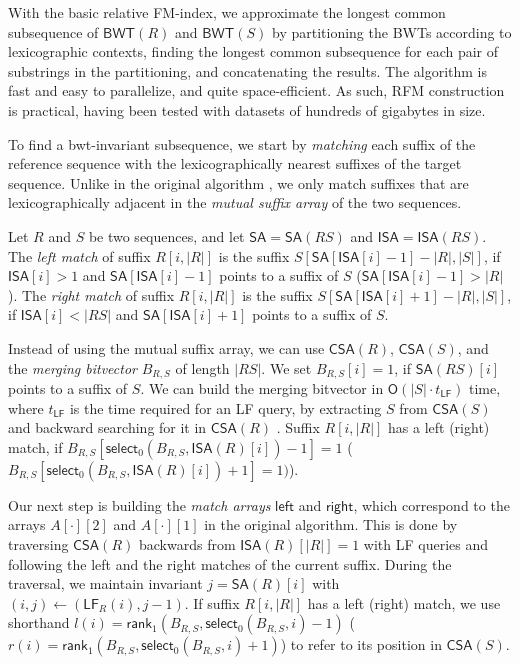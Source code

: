 \documentclass[a4paper,11pt]{llncs}
\newcommand{\abs}[1]{\ensuremath{\lvert #1 \rvert}}
\newcommand{\BWT}{\textsf{BWT}}
\newcommand{\RFM}{\textsf{RFM}}
\newcommand{\mSA}{\ensuremath{\mathsf{SA}}}
\newcommand{\mISA}{\ensuremath{\mathsf{ISA}}}
\newcommand{\mBWT}{\ensuremath{\mathsf{BWT}}}
\newcommand{\mCSA}{\ensuremath{\mathsf{CSA}}}
\newcommand{\mleft}{\ensuremath{\mathsf{left}}}
\newcommand{\mright}{\ensuremath{\mathsf{right}}}
\newcommand{\LF}{\textsf{LF}}
\newcommand{\mLF}{\ensuremath{\mathsf{LF}}}
\newcommand{\mrank}{\ensuremath{\mathsf{rank}}}
\newcommand{\mselect}{\ensuremath{\mathsf{select}}}
\newcommand{\Oh}{\ensuremath{\mathsf{O}}}
\begin{document}
With the basic relative FM-index, we approximate the longest common
subsequence of $\mBWT(R)$ and $\mBWT(S)$ by partitioning the \BWT{}s according
to lexicographic contexts, finding the longest common subsequence for each
pair of substrings in the partitioning, and concatenating the results. The
algorithm is fast and easy to parallelize, and quite space-efficient. As such,
\RFM{} construction is practical, having been tested with datasets of hundreds
of gigabytes in size.

To find a bwt-invariant subsequence, we start by \emph{matching} each suffix
of the reference sequence with the lexicographically nearest suffixes of the
target sequence. Unlike in the original algorithm \cite{Belazzougui2014}, we
only match suffixes that are lexicographically adjacent in the \emph{mutual
suffix array} of the two sequences.

\begin{definition}
Let $R$ and $S$ be two sequences, and let $\mSA = \mSA(RS)$ and $\mISA =
\mISA(RS)$. The \emph{left match} of suffix $R[i,\abs{R}]$ is the suffix
$S[\mSA[\mISA[i]-1] - \abs{R}, \abs{S}]$, if $\mISA[i] > 1$ and
$\mSA[\mISA[i]-1]$ points to a suffix of $S$ ($\mSA[\mISA[i]-1] > \abs{R}$).
The \emph{right match} of suffix $R[i,\abs{R}]$ is the suffix
$S[\mSA[\mISA[i]+1] - \abs{R}, \abs{S}]$, if $\mISA[i] < \abs{RS}$ and
$\mSA[\mISA[i]+1]$ points to a suffix of $S$.
\end{definition}

Instead of using the mutual suffix array, we can use $\mCSA(R)$, $\mCSA(S)$,
and the \emph{merging bitvector} $B_{R,S}$ of length $\abs{RS}$. We set
$B_{R,S}[i] = 1$, if $\mSA(RS)[i]$ points to a suffix of $S$. We can build the
merging bitvector in $\Oh(\abs{S} \cdot t_{\mLF})$ time, where $t_{\mLF}$ is
the time required for an \LF{} query, by extracting $S$ from $\mCSA(S)$ and
backward searching for it in $\mCSA(R)$ \cite{Siren2009}. Suffix
$R[i,\abs{R}]$ has a left (right) match, if $B_{R,S}[\mselect_{0}(B_{R,S},
\mISA(R)[i])-1] = 1$ ($B_{R,S}[\mselect_{0}(B_{R,S}, \mISA(R)[i])+1] = 1)$).

Our next step is building the \emph{match arrays} $\mleft$ and $\mright$,
which correspond to the arrays $A[\cdot][2]$ and $A[\cdot][1]$ in the original
algorithm. This is done by traversing $\mCSA(R)$ backwards from
$\mISA(R)[\abs{R}] = 1$ with \LF{} queries and following the left and the
right matches of the current suffix. During the traversal, we maintain
invariant $j = \mSA(R)[i]$ with $(i,j) \leftarrow (\mLF_{R}(i), j-1)$. If
suffix $R[i,\abs{R}]$ has a left (right) match, we use shorthand $l(i) =
\mrank_{1}(B_{R,S}, \mselect_{0}(B_{R,S}, i)-1)$ ($r(i) = \mrank_{1}(B_{R,S},
\mselect_{0}(B_{R,S}, i)+1)$) to refer to its position in $\mCSA(S)$.
\end{document}
